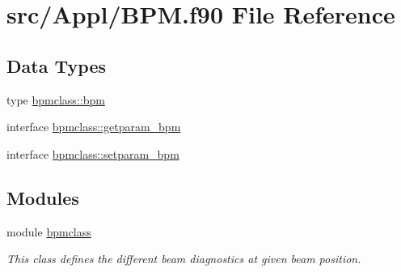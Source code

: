 \hypertarget{_b_p_m_8f90}{}\section{src/\+Appl/\+B\+PM.f90 File Reference}
\label{_b_p_m_8f90}
\subsection*{Data Types}
\begin{DoxyCompactItemize}
\item 
type \mbox{\hyperlink{namespacebpmclass_structbpmclass_1_1bpm}{bpmclass\+::bpm}}
\item 
interface \mbox{\hyperlink{interfacebpmclass_1_1getparam__bpm}{bpmclass\+::getparam\+\_\+bpm}}
\item 
interface \mbox{\hyperlink{interfacebpmclass_1_1setparam__bpm}{bpmclass\+::setparam\+\_\+bpm}}
\end{DoxyCompactItemize}
\subsection*{Modules}
\begin{DoxyCompactItemize}
\item 
module \mbox{\hyperlink{namespacebpmclass}{bpmclass}}
\begin{DoxyCompactList}\small\item\em This class defines the different beam diagnostics at given beam position. \end{DoxyCompactList}\end{DoxyCompactItemize}

